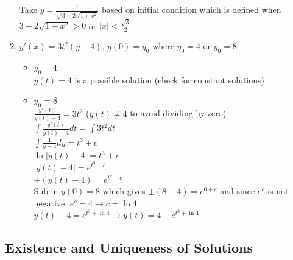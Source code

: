 \documentclass{article}
\begin{document}
\begin{enumerate}
    Take $y=\frac{1}{\sqrt{3-2\sqrt{1+x^2}}}$ based on initial condition which is defined when $3-2\sqrt{1+x^2}>0$ or $\vert x\vert<\frac{\sqrt{3}}{2}$
    \item $y'(x)=3t^2(y-4)$, $y(0)=y_0$ where $y_0=4$ or $y_0=8$
    \begin{itemize}
        \item $y_0=4$\\
        $y(t)=4$ is a possible solution (check for constant solutions)
        \item $y_0=8$\\
        $\frac{y'(t)}{y(t)-4}=3t^2$ ($y(t)\neq4$ to avoid dividing by zero)\\
        $\int\frac{y'(t)}{y(t)-4}dt=\int3t^2dt$\\
        $\int\frac{1}{y-4}dy=t^3+c$\\
        $\ln\vert y(t)-4\vert=t^3+c$\\
        $\vert y(t)-4\vert=e^{t^3+c}$\\
        $\pm(y(t)-4)=e^{t^3+c}$\\
        Sub in $y(0)=8$ which gives $\pm(8-4)=e^{0+c}$ and since $e^c$ is not negative, $e^c=4\rightarrow c=\ln4$\\
        $y(t)-4=e^{t^3+\ln4}\rightarrow y(t)=4+e^{t^3+\ln4}$
    \end{itemize}
\end{enumerate}
\subsection{Existence and Uniqueness of Solutions}
\label{sec:uniqueness}
\end{document}
